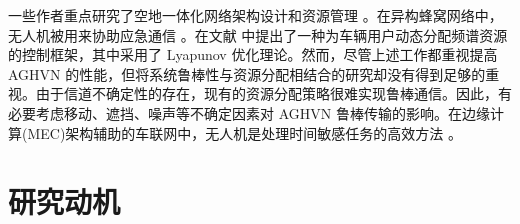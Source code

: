 一些作者重点研究了空地一体化网络架构设计和资源管理 \supercite{OUC,OSI}。在异构蜂窝网络中，无人机被用来协助应急通信 \supercite{DSF}。在文献 \cite{SDR}中提出了一种为车辆用户动态分配频谱资源的控制框架，其中采用了 Lyapunov 优化理论。然而，尽管上述工作都重视提高 AGHVN 的性能，但将系统鲁棒性与资源分配相结合的研究却没有得到足够的重视。由于信道不确定性的存在，现有的资源分配策略很难实现鲁棒通信。因此，有必要考虑移动、遮挡、噪声等不确定因素对 AGHVN 鲁棒传输的影响。在边缘计算(MEC)架构辅助的车联网中，无人机是处理时间敏感任务的高效方法 \supercite{无人机辅助230770}。
\section{研究动机}\label{section1-3}

